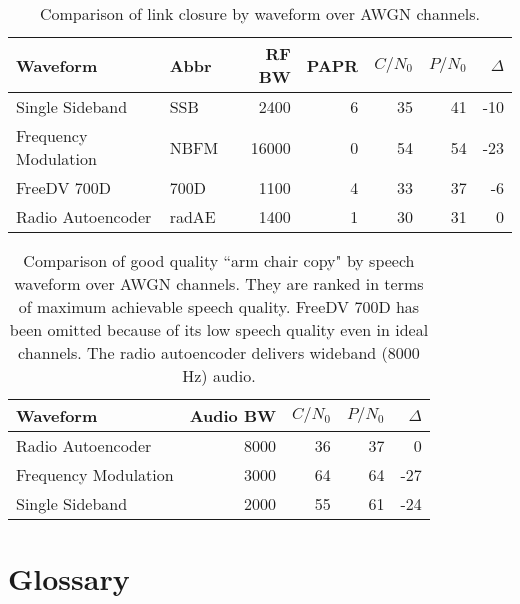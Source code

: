 \documentclass{article}
\begin{document}
\begin{table} [H]
\centering
\begin{tabular}{l l r r r r r}
 \hline
 Waveform             & Abbr  & RF BW & PAPR & $C/N_0$ & $P/N_0$ & $\Delta$ \\
 \hline
 Single Sideband      & SSB   & 2400  &  6 & 35 & 41 & -10 \\
 Frequency Modulation & NBFM  & 16000 &  0 & 54 & 54 & -23 \\
 FreeDV 700D          & 700D  & 1100  &  4 & 33 & 37 & -6  \\
 Radio Autoencoder    & radAE & 1400  &  1 & 30 & 31 &  0  \\
 \hline
\end{tabular}
\caption{Comparison of link closure by waveform over AWGN channels.}
\label{tab:waveforms_linkclosure}
\end{table}

\begin{table} [H]
\centering
\begin{tabular}{l r r r r}
 \hline
 Waveform             & Audio BW & $C/N_0$ & $P/N_0$ & $\Delta$ \\
 \hline
 Radio Autoencoder    & 8000 & 36 & 37 &   0 \\
 Frequency Modulation & 3000 & 64 & 64 & -27 \\
 Single Sideband      & 2000 & 55 & 61 & -24 \\
 \hline
\end{tabular}
\caption{Comparison of good quality ``arm chair copy" by speech waveform over AWGN channels. They are ranked in terms of maximum achievable speech quality. FreeDV 700D has been omitted because of its low speech quality even in ideal channels. The radio autoencoder delivers wideband (8000 Hz) audio.}
\label{tab:waveforms_good}
\end{table}

\section{Glossary}
\end{document}
